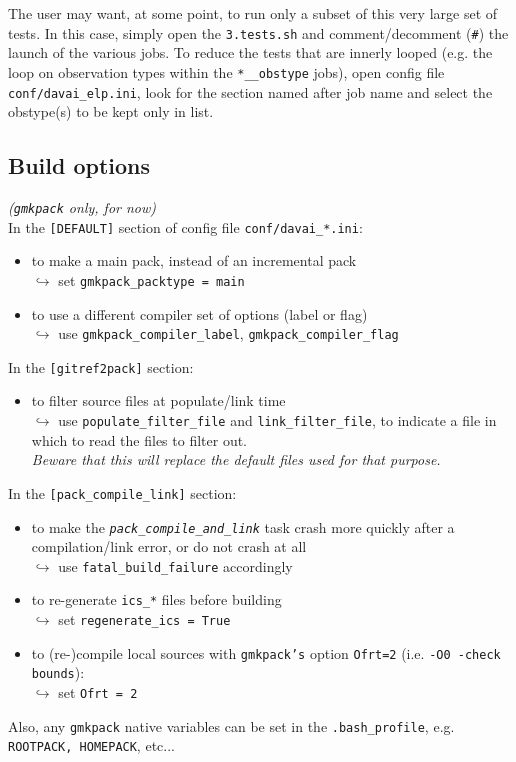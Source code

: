 \documentclass[a4paper,10pt,twoside]{article}
\begin{document}
The user may want, at some point, to run only a subset of this very large set of tests. In this case, simply open the \texttt{3.tests.sh} and comment/decomment (\texttt{\#}) the launch of the various jobs.
To reduce the tests that are innerly looped (e.g. the loop on observation types within the \texttt{*\_\_obstype} jobs), open config file \texttt{conf/davai\_elp.ini}, look for the section named after job name and select the obstype(s) to be kept only in list.


\subsection{Build options}
\textit{(\texttt{gmkpack} only, for now)}\\
In the \texttt{[DEFAULT]} section of config file \texttt{conf/davai\_*.ini}:
\begin{itemize}
 \item to make a main pack, instead of an incremental pack\\
 $\hookrightarrow$ set \texttt{gmkpack\_packtype = main}
 \item to use a different compiler set of options (label or flag)\\
 $\hookrightarrow$ use \texttt{gmkpack\_compiler\_label}, \texttt{gmkpack\_compiler\_flag}
\end{itemize}
In the \texttt{[gitref2pack]} section:
\begin{itemize}
 \item to filter source files at populate/link time\\
 $\hookrightarrow$ use \texttt{populate\_filter\_file} and \texttt{link\_filter\_file}, to indicate a file in which to read the files to filter out.\\
 \textit{Beware that this will replace the default files used for that purpose.}
\end{itemize}
In the \texttt{[pack\_compile\_link]} section:
\begin{itemize}
 \item to make the \texttt{\textit{pack\_compile\_and\_link}} task crash more quickly after a compilation/link error, or do not crash at all\\
 $\hookrightarrow$ use \texttt{fatal\_build\_failure} accordingly
 \item to re-generate \texttt{ics\_*} files before building\\
 $\hookrightarrow$ set \texttt{regenerate\_ics = True}
 \item to (re-)compile local sources with \texttt{gmkpack's} option \texttt{Ofrt=2} (i.e. \texttt{-O0 -check bounds}):\\
 $\hookrightarrow$ set \texttt{Ofrt = 2}
\end{itemize}
\noindent Also, any \texttt{gmkpack} native variables can be set in the \texttt{.bash\_profile}, e.g. \texttt{ROOTPACK, HOMEPACK}, etc...
\end{document}
